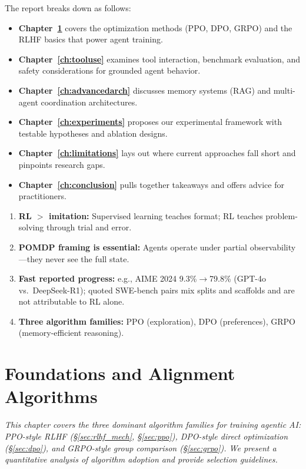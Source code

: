 \documentclass[12pt,a4paper]{report}
\theoremstyle{definition}
\begin{document}
The report breaks down as follows:
\begin{itemize}
    \item \textbf{Chapter~\ref{ch:foundations}} covers the optimization methods (PPO, DPO, GRPO) and the RLHF basics that power agent training.
    \item \textbf{Chapter~\ref{ch:tooluse}} examines tool interaction, benchmark evaluation, and safety considerations for grounded agent behavior.
    \item \textbf{Chapter~\ref{ch:advancedarch}} discusses memory systems (RAG) and multi-agent coordination architectures.
    \item \textbf{Chapter~\ref{ch:experiments}} proposes our experimental framework with testable hypotheses and ablation designs.
    \item \textbf{Chapter~\ref{ch:limitations}} lays out where current approaches fall short and pinpoints research gaps.
    \item \textbf{Chapter~\ref{ch:conclusion}} pulls together takeaways and offers advice for practitioners.
\end{itemize}

\begin{tcolorbox}[colback=cyan!5!white, colframe=cyan!60!black, title=\textbf{Chapter 1 Key Takeaways}]
\begin{enumerate}
    \item \textbf{RL $>$ imitation:} Supervised learning teaches format; RL teaches problem-solving through trial and error.
    \item \textbf{POMDP framing is essential:} Agents operate under partial observability---they never see the full state.
    \item \textbf{Fast reported progress:} e.g., AIME 2024 9.3\%$\rightarrow$79.8\% (GPT-4o vs.\ DeepSeek-R1); quoted SWE-bench pairs mix splits and scaffolds and are not attributable to RL alone.
    \item \textbf{Three algorithm families:} PPO (exploration), DPO (preferences), GRPO (memory-efficient reasoning).
\end{enumerate}
\end{tcolorbox}

\chapter{Foundations and Alignment Algorithms}
\label{ch:foundations}

\textit{This chapter covers the three dominant algorithm families for training agentic AI: PPO-style RLHF (\S\ref{sec:rlhf_mech}, \S\ref{sec:ppo}), DPO-style direct optimization (\S\ref{sec:dpo}), and GRPO-style group comparison (\S\ref{sec:grpo}). We present a quantitative analysis of algorithm adoption and provide selection guidelines.}
\end{document}
